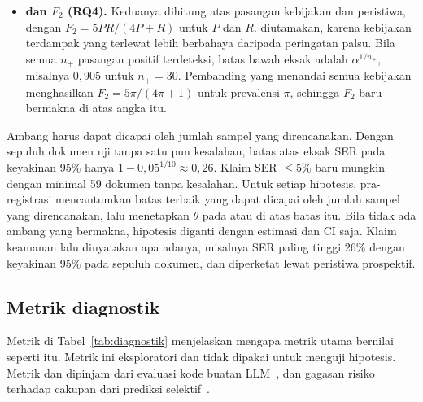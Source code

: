 \begin{itemize}[leftmargin=*,nosep]
  \item \textbf{ dan $F_2$ (RQ4).} Keduanya dihitung atas pasangan kebijakan dan peristiwa, dengan $F_2 = 5PR/(4P+R)$ untuk  $P$ dan  $R$.  diutamakan, karena kebijakan terdampak yang terlewat lebih berbahaya daripada peringatan palsu. Bila semua $n_+$ pasangan positif terdeteksi, batas bawah eksak  adalah $\alpha^{1/n_+}$, misalnya $0{,}905$ untuk $n_+ = 30$. Pembanding yang menandai semua kebijakan menghasilkan $F_2 = 5\pi/(4\pi+1)$ untuk prevalensi $\pi$, sehingga $F_2$ baru bermakna di atas angka itu.
\end{itemize}

Ambang harus dapat dicapai oleh jumlah sampel yang direncanakan. Dengan sepuluh dokumen uji tanpa satu pun kesalahan, batas atas eksak SER pada keyakinan 95\% hanya $1-0{,}05^{1/10} \approx 0{,}26$. Klaim SER $\leq 5\%$ baru mungkin dengan minimal 59 dokumen tanpa kesalahan. Untuk setiap hipotesis, pra-registrasi mencantumkan batas terbaik yang dapat dicapai oleh jumlah sampel yang direncanakan, lalu menetapkan $\theta$ pada atau di atas batas itu. Bila tidak ada ambang yang bermakna, hipotesis diganti dengan estimasi dan CI saja. Klaim keamanan lalu dinyatakan apa adanya, misalnya SER paling tinggi 26\% dengan keyakinan 95\% pada sepuluh dokumen, dan diperketat lewat peristiwa prospektif.


\subsection{Metrik diagnostik}
\label{subsec:diagnostik}

Metrik di Tabel~\ref{tab:diagnostik} menjelaskan mengapa metrik utama bernilai seperti itu. Metrik ini eksploratori dan tidak dipakai untuk menguji hipotesis. Metrik  dan  dipinjam dari evaluasi kode buatan LLM~\cite{chen2021evaluating,li2022alphacode}, dan gagasan risiko terhadap cakupan dari prediksi selektif~\cite{varshney2022selective}.

